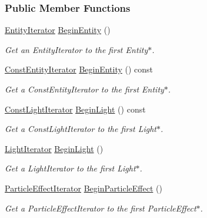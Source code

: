 \subsubsection*{Public Member Functions}
\begin{DoxyCompactItemize}
\item 
\hyperlink{classMezzanine_1_1SceneManager_a870dd323419dc7efe957cacc19a1391c}{EntityIterator} \hyperlink{classMezzanine_1_1SceneManager_abc6dd9387dac2ae2aef9502d01d1ec35}{BeginEntity} ()
\begin{DoxyCompactList}\small\item\em Get an EntityIterator to the first Entity$\ast$. \item\end{DoxyCompactList}\item 
\hyperlink{classMezzanine_1_1SceneManager_a4fb46d68331a77da9036a3f704f7ee40}{ConstEntityIterator} \hyperlink{classMezzanine_1_1SceneManager_a016bbb0dfd8a03e838d13131f298499f}{BeginEntity} () const 
\begin{DoxyCompactList}\small\item\em Get a ConstEntityIterator to the first Entity$\ast$. \item\end{DoxyCompactList}\item 
\hyperlink{classMezzanine_1_1SceneManager_ad4f4649f45b71ddc0d728e64facd03c3}{ConstLightIterator} \hyperlink{classMezzanine_1_1SceneManager_a5a50580c0389d0881dc8c1fb787370b2}{BeginLight} () const 
\begin{DoxyCompactList}\small\item\em Get a ConstLightIterator to the first Light$\ast$. \item\end{DoxyCompactList}\item 
\hyperlink{classMezzanine_1_1SceneManager_a5c5a83086e8b63d21bcfcf38b0888101}{LightIterator} \hyperlink{classMezzanine_1_1SceneManager_a1571d4ee6e74d8f1be76c99281740221}{BeginLight} ()
\begin{DoxyCompactList}\small\item\em Get a LightIterator to the first Light$\ast$. \item\end{DoxyCompactList}\item 
\hyperlink{classMezzanine_1_1SceneManager_a68a1a1ddc03cee28204759224405d40c}{ParticleEffectIterator} \hyperlink{classMezzanine_1_1SceneManager_a97940bd86436528fdbdad5992bad4e0c}{BeginParticleEffect} ()
\begin{DoxyCompactList}\small\item\em Get a ParticleEffectIterator to the first ParticleEffect$\ast$. \item\end{DoxyCompactList}\item 

\end{DoxyCompactItemize}
